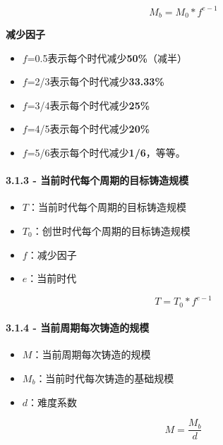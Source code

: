 \documentclass[
]{article}
\providecommand{\tightlist}{%
  \setlength{\itemsep}{0pt}\setlength{\parskip}{0pt}}
\begin{document}
\begin{equation}
M_b = M_0 * f^{e-1}
\end{equation}

\textbf{减少因子}

\begin{itemize}
\tightlist
\item
  \(f\)=0.5表示每个时代减少\textbf{50\%}（减半）
\item
  \(f\)=2/3表示每个时代减少\textbf{33.33\%}
\item
  \(f\)=3/4表示每个时代减少\textbf{25\%}
\item
  \(f\)=4/5表示每个时代减少\textbf{20\%}
\item
  \(f\)=5/6表示每个时代减少\textbf{1/6}，等等。
\end{itemize}

\paragraph{3.1.3 -
当前时代每个周期的目标铸造规模}\label{ux5f53ux524dux65f6ux4ee3ux6bcfux4e2aux5468ux671fux7684ux76eeux6807ux94f8ux9020ux89c4ux6a21}

\begin{itemize}
\tightlist
\item
  \(T\)：当前时代每个周期的目标铸造规模
\item
  \(T_0\)：创世时代每个周期的目标铸造规模
\item
  \(f\)：减少因子
\item
  \(e\)：当前时代
\end{itemize}

\begin{equation}
 T = T_0 * f^{e-1}
\end{equation}

\paragraph{3.1.4 -
当前周期每次铸造的规模}\label{ux5f53ux524dux5468ux671fux6bcfux6b21ux94f8ux9020ux7684ux89c4ux6a21}

\begin{itemize}
\tightlist
\item
  \(M\)：当前周期每次铸造的规模
\item
  \(M_b\)：当前时代每次铸造的基础规模
\item
  \(d\)：难度系数
\end{itemize}

\begin{equation}
M = \frac{M_b}{d}
\end{equation}
\end{document}
